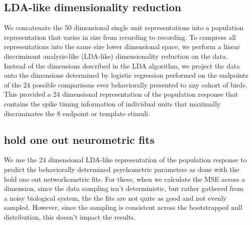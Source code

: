 \subsection*{LDA-like dimensionality reduction}

We concatenate the 50 dimensional single unit representations into a population representation that varies in size from recording to recording. To compress all representations into the same size lower dimensional space, we perform a linear discriminant analysis-like (LDA-like) dimensionality reduction on the data. Instead of the dimensions described in the LDA algorithm, we project the data onto the dimensions determined by logistic regression performed on the endpoints of the 24 possible comparisons ever behaviorally presented to any cohort of birds. This provided a 24 dimensional representation of the population response that contains the spike timing information of individual units that maximally discriminates the 8 endpoint or template stimuli.

\subsection*{hold one out neurometric fits}

We use the 24 dimensional LDA-like representation of the population response to predict the behaviorally determined psychometric parameters as done with the hold one out networkometric fits. For these, when we calculate the MSE across a dimension, since the data sampling isn't deterministic, but rather gathered from a noisy biological system, the the fits are not quite as good and not evenly sampled. However, since the sampling is consistent across the bootstrapped null distribution, this doesn't impact the results.